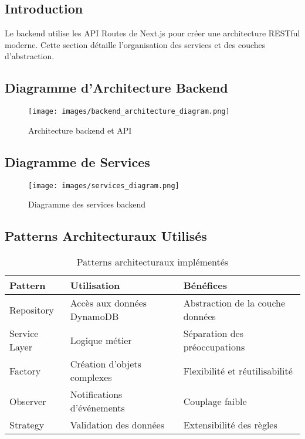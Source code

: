 \subsection{Introduction}

Le backend utilise les API Routes de Next.js pour créer une architecture RESTful moderne. Cette section détaille l'organisation des services et des couches d'abstraction.

\subsection{Diagramme d'Architecture Backend}

\begin{figure}[H]
    \centering
    \texttt{[image: images/backend\_architecture\_diagram.png]}
    \caption{Architecture backend et API}
    \label{fig:backend_architecture}
\end{figure}

\subsection{Diagramme de Services}

\begin{figure}[H]
    \centering
    \texttt{[image: images/services\_diagram.png]}
    \caption{Diagramme des services backend}
    \label{fig:services_diagram}
\end{figure}

\subsection{Patterns Architecturaux Utilisés}

\begin{table}[H]
    \centering
    \begin{tabularx}{\textwidth}{|l|X|X|}
        \hline
        \textbf{Pattern} & \textbf{Utilisation} & \textbf{Bénéfices} \\
        \hline
        Repository & Accès aux données DynamoDB & Abstraction de la couche données \\
        \hline
        Service Layer & Logique métier & Séparation des préoccupations \\
        \hline
        Factory & Création d'objets complexes & Flexibilité et réutilisabilité \\
        \hline
        Observer & Notifications d'événements & Couplage faible \\
        \hline
        Strategy & Validation des données & Extensibilité des règles \\
        \hline
    \end{tabularx}
    \caption{Patterns architecturaux implémentés}
    \label{tab:design_patterns}
\end{table}

